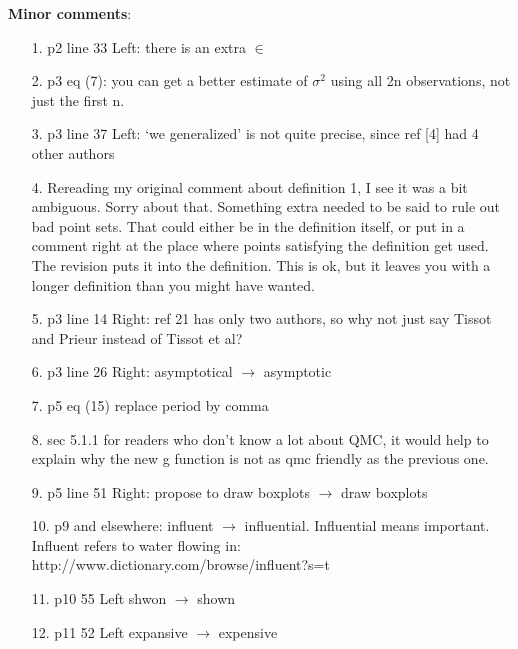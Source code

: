 \documentclass[10pt,a4paper]{article}
\begin{document}
\textbf{Minor comments}:
\begin{itemize}
\item[1.] p2 line 33 Left: there is an extra $\in$

\item[2.] p3 eq (7): you can get a better estimate of $\sigma^2$ using all 2n observations, not just the first n.

\item[3.] p3 line 37 Left: `we generalized' is not quite precise, since ref [4] had 4 other authors

\item[4.] Rereading my original comment about definition 1, I see it was a bit ambiguous. Sorry about that. Something extra needed to be said to rule out bad point sets.  That could either be in the definition itself, or put in a comment right at the place where points satisfying the definition get used.  The revision puts it into the definition.  This is ok, but it leaves you with a longer definition than you might have wanted.

\item[5.] p3 line 14 Right: ref 21 has only two authors, so why not just say Tissot and Prieur instead of Tissot et al?

\item[6.] p3 line 26 Right: asymptotical $\rightarrow$ asymptotic

\item[7.] p5 eq (15) replace period by comma

\item[8.] sec 5.1.1  for readers who don't know a lot about QMC, it would help to explain why the new g function is not as qmc friendly as the previous one.

\item[9.] p5 line 51 Right: propose to draw boxplots $\rightarrow$ draw boxplots

\item[10.] p9 and elsewhere: influent $\rightarrow$ influential.  Influential means important. Influent refers to water flowing in: \\
http://www.dictionary.com/browse/influent?s=t

\item[11.] p10 55 Left shwon $\rightarrow$ shown

\item[12.] p11 52 Left expansive $\rightarrow$ expensive
\end{itemize}
\end{document}
